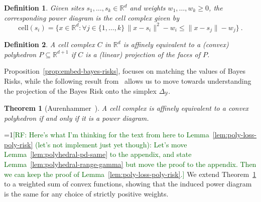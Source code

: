 \documentclass[12pt]{article}
\newcommand{\Comments}{1}
\newcommand{\mynote}[2]{\ifnum\Comments=1\textcolor{#1}{#2}\fi}
\newcommand{\raf}[1]{\mynote{darkgreen}{[RF: #1]}}
\newcommand{\reals}{\mathbb{R}}
\newcommand{\cell}{\mathrm{cell}}
\newcommand{\simplex}{\Delta_\Y}
\newcommand{\Y}{\mathcal{Y}}
\newtheorem{theorem}{Theorem}
\newtheorem{definition}{Definition}
\begin{document}
\begin{definition}\label{def:power-diagram}
  Given sites $s_1,\ldots,s_k\in\reals^d$ and weights $w_1,\ldots,w_k \geq 0$, the corresponding \emph{power diagram} is the cell complex given by
  \begin{equation}
    \label{eq:pd}
    \cell(s_i) = \{ x \in\reals^d : \forall j \in \{1,\ldots,k\} \, \|x - s_i\|^2 - w_i \leq \|x - s_j\| - w_j\}~.
  \end{equation}
\end{definition}

\begin{definition}\label{def:affine-equiv}
  A cell complex $C$ in $\reals^d$ is \emph{affinely equivalent} to a (convex) polyhedron $P \subseteq \reals^{d+1}$ if $C$ is a (linear) projection of the faces of $P$.
\end{definition}

Proposition~\ref{prop:embed-bayes-risks}, focuses on matching the values of Bayes Risks, while the following result from~\citet{aurenhammer1987power} allows us to move towards understanding the projection of the Bayes Risk onto the simplex $\simplex$.

\begin{theorem}[Aurenhammer~\cite{aurenhammer1987power}]\label{thm:aurenhammer}
	A cell complex is affinely equivalent to a convex polyhedron if and only if it is a power diagram.
\end{theorem}

\raf{Here's what I'm thinking for the text from here to Lemma~\ref{lem:poly-loss-poly-risk} (let's not implement just yet though): Let's move Lemma~\ref{lem:polyhedral-pd-same} to the appendix, and state Lemma~\ref{lem:polyhedral-range-gamma} but move the proof to the appendix.  Then we can keep the proof of Lemma~\ref{lem:poly-loss-poly-risk}.}
We extend Theorem~\ref{thm:aurenhammer} to a weighted sum of convex functions, showing that the induced power diagram is the same for any choice of strictly positive weights.
\end{document}
